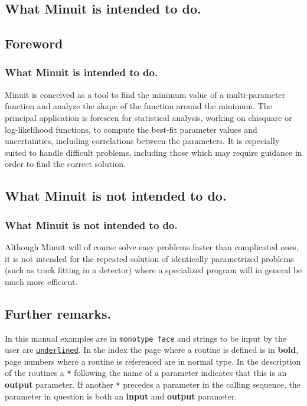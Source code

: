 \section*{What Minuit is intended to do.}
\begin{htmlonly}
\chapter{Foreword}
\subsection*{What Minuit is intended to do.}
\end{htmlonly}
Minuit is conceived as a tool to find the minimum value of a
multi-parameter function and analyze the shape of the function around
the minimum. The principal application is foreseen for statistical
analysis, working on chisquare or log-likelihood functions, to compute
the best-fit parameter values and uncertainties, including
correlations between the parameters.  It is especially suited to
handle difficult problems, including those which may require guidance
in order to find the correct solution.
\section*{What Minuit is not intended to do.}
\begin{htmlonly}
\subsection*{What Minuit is not intended to do.}
\end{htmlonly}

Although Minuit will of course solve easy problems faster than complicated
ones, it is not intended for the repeated solution of identically parametrized
problems (such as track fitting in a detector) where a specialized
program will in general be much more efficient.
 

\section*{Further remarks.}
 
In this manual examples are in {\tt monotype face} and strings to be
input by the user are {\tt\underline{underlined}}.  In the index the
page where a routine is defined is in {\bf bold}, page numbers where a
routine is referenced are in normal type.  In the description of the
routines a \texttt{*} following the name of a parameter indicates that
this is an {\bf output} parameter.  If another \texttt{*} precedes a
parameter in the calling sequence, the parameter in question is both
an {\bf input} and {\bf output} parameter.

